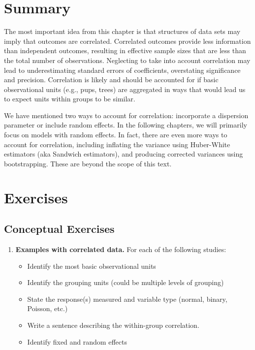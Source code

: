 \documentclass[
]{krantz}
\providecommand{\tightlist}{%
  \setlength{\itemsep}{0pt}\setlength{\parskip}{0pt}}
\begin{document}
\hypertarget{summary-2}{%
\section{Summary}\label{summary-2}}

The most important idea from this chapter is that structures of data sets may imply that outcomes are correlated. Correlated outcomes provide less information than independent outcomes, resulting in effective sample sizes that are less than the total number of observations. Neglecting to take into account correlation may lead to underestimating standard errors of coefficients, overstating significance and precision. Correlation is likely and should be accounted for if basic observational units (e.g., pups, trees) are aggregated in ways that would lead us to expect units within groups to be similar.

We have mentioned two ways to account for correlation: incorporate a dispersion parameter or include random effects. In the following chapters, we will primarily focus on models with random effects. In fact, there are even more ways to account for correlation, including inflating the variance using Huber-White estimators (aka Sandwich estimators), and producing corrected variances using bootstrapping. These are beyond the scope of this text.

\hypertarget{exercises-6}{%
\section{Exercises}\label{exercises-6}}

\hypertarget{conceptual-exercises-4}{%
\subsection{Conceptual Exercises}\label{conceptual-exercises-4}}

\begin{enumerate}
\def\labelenumi{\arabic{enumi}.}
\tightlist
\item
  \textbf{Examples with correlated data.} For each of the following studies:

  \begin{itemize}
  \tightlist
  \item
    Identify the most basic observational units
  \item
    Identify the grouping units (could be multiple levels of grouping)
  \item
    State the response(s) measured and variable type (normal, binary, Poisson, etc.)
  \item
    Write a sentence describing the within-group correlation.
  \item
    Identify fixed and random effects
  \end{itemize}
\end{enumerate}
\end{document}
